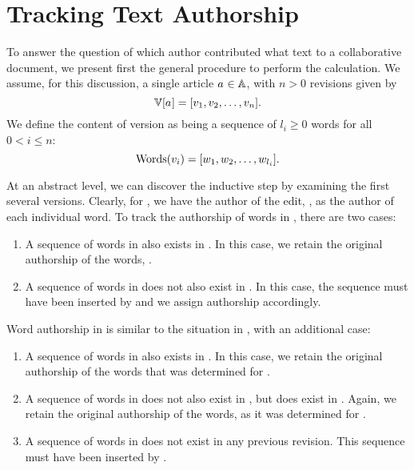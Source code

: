 \section{Tracking Text Authorship}
\label{sec:diff-tracking}

To answer the question of which author contributed what text to a
collaborative document, we present first the general procedure to
perform the calculation.
We assume, for this discussion, a single article $a_{} \in \mathbb{A}$,
with $n > 0$ revisions given by
\begin{equation*}
\versions{\article{}} = [ \version{1}, \version{2}, \ldots, \version{n} ].
\end{equation*}
We define the content of version 
as being a sequence of $l_i \ge 0$ words for all $0 < i \le n$:
\begin{equation*}
\mathrm{Words}(v_{i}) = [ w_1, w_2, \ldots, w_{l_i} ].
\end{equation*}


At an abstract level, we can discover the inductive step by examining
the first several versions.
Clearly, for , we have the author of the edit,
, as the author of each individual word.
To track the authorship of words in , there are two cases:
\begin{enumerate}
\item A sequence of words in  also exists in .
	In this case, we retain the original authorship of the words,
	.
\item A sequence of words in  does not also exist in .
	In this case, the sequence must have been inserted by
	 and we assign authorship accordingly.
\end{enumerate}
Word authorship in  is similar to the situation in
, with an additional case:
\begin{enumerate}
\item A sequence of words in  also exists in .
	In this case, we retain the original authorship of the words
	that was determined for .
\item A sequence of words in  does not also exist in ,
	but does exist in .
	Again, we retain the original authorship of the words, as it was
	determined for .
\item A sequence of words in  does not exist in any previous
	revision.
	This sequence must have been inserted by .
\end{enumerate}

